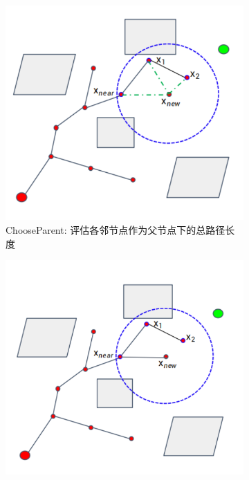 \documentclass[../main.tex]{subfiles}
\begin{document}
\begin{enumerate}
\begin{figure}[H]
\begin{subfigure}[b]{0.19\textwidth}
                    \includegraphics[width=\linewidth]{images/rrts/rrts2.png}
                    \caption{ChooseParent: 评估各邻节点作为父节点下的总路径长度}
                    \label{fig:rrts2}
                \end{subfigure}
                \begin{subfigure}[b]{0.19\textwidth}
                    \includegraphics[width=\linewidth]{images/rrts/rrts3.png}

\end{subfigure}
\end{figure}
\end{enumerate}
\end{document}

